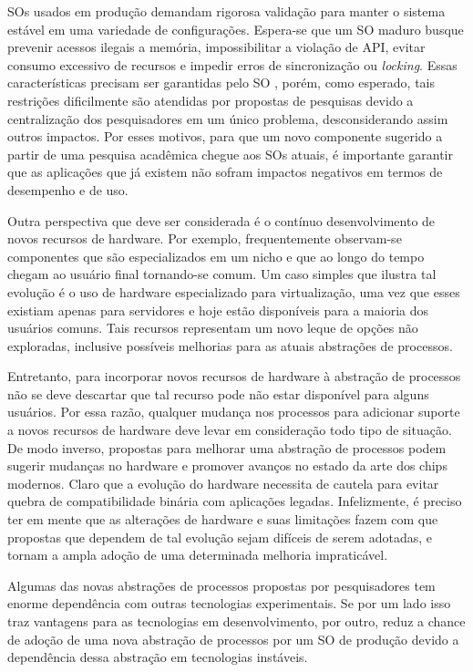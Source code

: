 SOs usados em produção demandam rigorosa validação para manter o sistema
estável em uma variedade de configurações. Espera-se que um SO maduro busque
prevenir acessos ilegais a memória, impossibilitar a violação de API, evitar
consumo excessivo de recursos e impedir erros de sincronização ou
\textit{locking}. Essas características precisam ser garantidas pelo SO
\citep{mondrix}, porém, como esperado, tais restrições dificilmente são
atendidas por propostas de pesquisas devido a centralização dos pesquisadores
em um único problema, desconsiderando assim outros impactos. Por esses motivos,
para que um novo componente sugerido a partir de uma pesquisa acadêmica chegue
aos SOs atuais, é importante garantir que as aplicações que já existem não
sofram impactos negativos em termos de desempenho e de uso.

Outra perspectiva que deve ser considerada é o contínuo desenvolvimento de novos
recursos de hardware. Por exemplo, frequentemente observam-se componentes que
são especializados em um nicho e que ao longo do tempo chegam ao usuário
final tornando-se comum. Um caso simples que ilustra tal evolução é o
uso de hardware especializado para virtualização, uma vez que esses existiam
apenas para servidores e hoje estão disponíveis para a maioria dos usuários
comuns. Tais recursos representam um novo leque de opções não exploradas,
inclusive possíveis melhorias para as atuais abstrações de processos.

Entretanto, para incorporar novos recursos de hardware à abstração de processos
não se deve descartar que tal recurso pode não estar disponível para alguns
usuários. Por essa razão, qualquer mudança nos processos para adicionar suporte
a novos recursos de hardware deve levar em consideração todo tipo de situação.
De modo inverso, propostas para melhorar uma abstração de processos podem
sugerir mudanças no hardware e promover avanços no estado da arte dos chips
modernos. Claro que a evolução do hardware necessita de cautela para evitar
quebra de compatibilidade binária com aplicações legadas. Infelizmente, é
preciso ter em mente que as alterações de hardware e suas limitações fazem com
que propostas que dependem de tal evolução sejam difíceis de serem adotadas, e
tornam a ampla adoção de uma determinada melhoria impraticável.

Algumas das novas abstrações de processos propostas por pesquisadores tem
enorme dependência com outras tecnologias experimentais. Se por um lado isso
traz vantagens para as tecnologias em desenvolvimento, por outro, reduz a chance
de adoção de uma nova abstração de processos por um SO de produção devido a
dependência dessa abstração em tecnologias instáveis.

